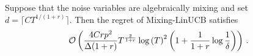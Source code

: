 \begin{corollary}
\label{cor2:algebraic_mixing}
Suppose that the noise variables are algebraically mixing and set $d=\lceil CT^{1/(1+r)}\rceil$. Then the regret of Mixing-LinUCB satisfies
\begin{equation*}
\mathcal{O}\left( \frac{4Crp^2}{\Delta(1+r)}T^{\frac{2}{1+r}}\log\left(T\right)^2\left(1+\frac{1}{1+r}\log \frac{1}{\delta}\right)\right)\,.
\end{equation*}
\label{cor:gap_reg_alg}
\end{corollary}

